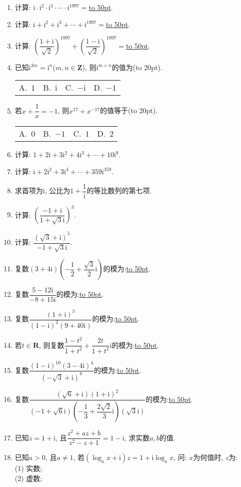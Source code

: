 \documentclass[10pt,a4paper]{article}
\newcommand{\blank}[1]{\underline{\hbox to #1pt{}}}
\newcommand{\bracket}[1]{(\hbox to #1pt{})}
\newcommand{\fourch}[4]{\par\begin{tabular}{p{.23\textwidth}p{.23\textwidth}p{.23\textwidth}p{.23\textwidth}}
A.~#1 &B.~#2& C.~#3& D.~#4
\end{tabular}}
\begin{document}
\begin{enumerate}[1.]
\item 计算: $\mathrm{i}\cdot \mathrm{i}^2\cdot \mathrm{i}^3\cdot \cdots \cdot \mathrm{i}^{1997}=$\blank{50}.
\item 计算: $\mathrm{i}+\mathrm{i}^2+\mathrm{i}^3+\cdots +\mathrm{i}^{1997}=$\blank{50}.
\item 计算: $(\dfrac{1+\mathrm{i}}{\sqrt 2})^{1997}+(\dfrac{1-\mathrm{i}}{\sqrt 2})^{1997}=$\blank{50}.
\item 已知$\mathrm{i}^{3m}=\mathrm{i}^n$($m,n\in \mathbf{Z}$), 则$\mathrm{i}^{m+n}$的值为\bracket{20}.
\fourch{$1$}{$\mathrm{i}$}{$-\mathrm{i}$}{$-1$}
\item 若$x+\dfrac 1x=-1$, 则$x^{17}+x^{-17}$的值等于\bracket{20}.
\fourch{$0$}{$-1$}{$1$}{$2$}
\item 计算: $1+2\mathrm{i}+3\mathrm{i}^2+4\mathrm{i}^3+\cdots +10\mathrm{i}^9$.
\item 计算:  $\mathrm{i}+2\mathrm{i}^2+3\mathrm{i}^3+\cdots +359\mathrm{i}^{359}$.
\item 求首项为$\mathrm{i}$, 公比为$1+\dfrac 1{\mathrm{i}}$的等比数列的第七项.
\item 计算: $(\dfrac{-1+\mathrm{i}}{1+\sqrt 3\mathrm{i}})^3$.
\item 计算: $\dfrac{{{(\sqrt 3+\mathrm{i})}^5}}{-1+\sqrt 3\mathrm{i}}$.
\item 复数$(3+4\mathrm{i})(-\dfrac 12+\dfrac{\sqrt 3}2\mathrm{i})$的模为:\blank{50}.
\item 复数$\dfrac{5-12\mathrm{i}}{-8+15\mathrm{i}}$的模为:\blank{50}.
\item 复数$\dfrac{{{(1+\mathrm{i})}^3}}{{{(1-\mathrm{i})}^2}(9+40\mathrm{i})}$的模为:\blank{50}.
\item 若$t\in \mathbf{R}$, 则复数$\dfrac{1-{t^2}}{1+{t^2}}+\dfrac{2t}{1+{t^2}}\mathrm{i}$的模为:\blank{50}.
\item 复数$\dfrac{{{(1-\mathrm{i})}^{10}}{{(3-4\mathrm{i})}^4}}{{{(-\sqrt 3+\mathrm{i})}^8}}$的模为:\blank{50}.
\item 复数$\dfrac{(\sqrt 6+\mathrm{i}){{(1+\mathrm{i})}^2}}{(-1+\sqrt 6\mathrm{i})(-\dfrac 13+\dfrac{2\sqrt 2}3\mathrm{i})(\sqrt 3\mathrm{i})}$的模为:\blank{50}.
\item 已知$z=1+\mathrm{i}$, 且$\dfrac{{z^2}+az+b}{{z^2}-z+1}=1-\mathrm{i}$, 求实数$a,b$的值.
\item 已知$a>0$, 且$a\ne 1$, 若$(\log _ax+\mathrm{i})z=1+\mathrm{i}\log _ax$, 问: $x$为何值时, $z$为:\\
(1) 实数;\\
(2) 虚数;\\

\end{enumerate}
\end{document}
